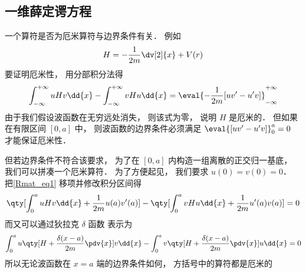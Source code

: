 
\subsection{一维薛定谔方程}
一个算符是否为厄米算符与边界条件有关． 例如
\begin{equation}
H = -\frac{1}{2m}\dv[2]{x} + V(r)
\end{equation}
要证明厄米性， 用分部积分法得
\begin{equation}\label{Rmat_eq1}
\int_{-\infty}^{+\infty} uHv\dd{x} - \int_{-\infty}^{+\infty} vHu\dd{x}
= \eval{-\frac{1}{2m}[uv' - u'v]}_{-\infty}^{+\infty}
\end{equation}
由于我们假设波函数在无穷远处消失， 则该式为零， 说明 $H$ 是厄米的． 但如果在有限区间 $[0, a]$ 中， 则波函数的边界条件必须满足 $\eval{[uv' - u'v]}_{0}^{a} = 0$ 才能保证厄米性．

但若边界条件不符合该要求， 为了在 $[0,a]$ 内构造一组离散的正交归一基底， 我们可以拼凑一个厄米算符． 为了方便起见， 我们要求 $u(0) = v(0) = 0$． 把\autoref{Rmat_eq1} 移项并修改积分区间得
\begin{equation}
\qty[\int_{0}^{a} uHv\dd{x} + \frac{1}{2m}u(a)v'(a)] - \qty[\int_{0}^{a} vHu\dd{x} + \frac{1}{2m}u'(a)v(a)]
= 0
\end{equation}
而又可以通过狄拉克 $\delta$ 函数 表示为
\begin{equation}
\int_{0}^{a} u\qty[H + \frac{\delta(x-a)}{2m}\pdv{x}] v\dd{x} -
\int_{0}^{a} v\qty[H + \frac{\delta(x-a)}{2m}\pdv{x}] u\dd{x} = 0
\end{equation}
所以无论波函数在 $x=a$ 端的边界条件如何， 方括号中的算符都是厄米的
